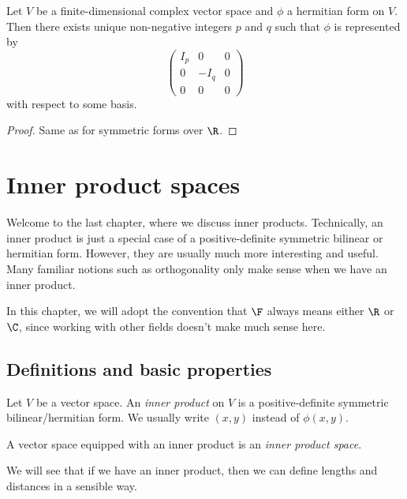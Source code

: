 \documentclass[a4paper]{article}
\begin{document}
\begin{thm}
  Let $V$ be a finite-dimensional complex vector space and $\phi$ a hermitian form on $V$. Then there exists unique non-negative integers $p$ and $q$ such that $\phi$ is represented by
  \[
    \begin{pmatrix}
      I_p & 0 & 0\\
      0 & -I_q & 0\\
      0 & 0 & 0
    \end{pmatrix}
  \]
  with respect to some basis.
\end{thm}

\begin{proof}
  Same as for symmetric forms over $\R$.
\end{proof}

\section{Inner product spaces}
Welcome to the last chapter, where we discuss inner products. Technically, an inner product is just a special case of a positive-definite symmetric bilinear or hermitian form. However, they are usually much more interesting and useful. Many familiar notions such as orthogonality only make sense when we have an inner product.

In this chapter, we will adopt the convention that $\F$ always means either $\R$ or $\C$, since working with other fields doesn't make much sense here.

\subsection{Definitions and basic properties}
\begin{defi}
  Let $V$ be a vector space. An \emph{inner product} on $V$ is a positive-definite symmetric bilinear/hermitian form. We usually write $(x, y)$ instead of $\phi(x, y)$.

  A vector space equipped with an inner product is an \emph{inner product space}.
\end{defi}
We will see that if we have an inner product, then we can define lengths and distances in a sensible way.
\end{document}

